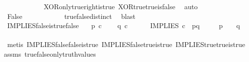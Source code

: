\begin{isabellebody}
\ \ \ \ \ \ \ \ \ \ \isamarkupfalse%
\ XOR{\isacharunderscore}{\kern0pt}only{\isacharunderscore}{\kern0pt}true{\isacharunderscore}{\kern0pt}right{\isacharunderscore}{\kern0pt}is{\isacharunderscore}{\kern0pt}true\ XOR{\isacharunderscore}{\kern0pt}true{\isacharunderscore}{\kern0pt}true{\isacharunderscore}{\kern0pt}is{\isacharunderscore}{\kern0pt}false\ \isamarkupfalse%
\ auto\isanewline
\ \ \ \ \ \ \ \ \isamarkupfalse%
\ \isamarkupfalse%
\ False\isanewline
\ \ \ \ \ \ \ \ \ \ \isamarkupfalse%
\ true{\isacharunderscore}{\kern0pt}false{\isacharunderscore}{\kern0pt}distinct\ \isamarkupfalse%
\ blast\isanewline
\ \ \ \ \ \ \isamarkupfalse%
\isanewline
\ \ \ \ \isamarkupfalse%
\isanewline
\ \ \isamarkupfalse%
\isanewline
{}\isamarkupfalse%
%
\endisatagproof
{\isafoldproof}%
%
\isadelimproof
\isanewline
%
\endisadelimproof
\isanewline
{}\isamarkupfalse%
\ IMPLIES{\isacharunderscore}{\kern0pt}false{\isacharunderscore}{\kern0pt}is{\isacharunderscore}{\kern0pt}true{\isacharunderscore}{\kern0pt}false{\isacharcolon}{\kern0pt}\isanewline
\ \ \ {\isachardoublequoteopen}p\ {\isasymin}\isactrlsub c\ {\isasymOmega}{\isachardoublequoteclose}\isanewline
\ \ \ {\isachardoublequoteopen}q\ {\isasymin}\isactrlsub c\ {\isasymOmega}{\isachardoublequoteclose}\ \ \isanewline
\ \ \ {\isachardoublequoteopen}IMPLIES\ {\isasymcirc}\isactrlsub c\ \ {\isasymlangle}p{\isacharcomma}{\kern0pt}q{\isasymrangle}\ {\isacharequal}{\kern0pt}\ {\isasymf}{\isachardoublequoteclose}\isanewline
\ \ \ {\isachardoublequoteopen}p\ {\isacharequal}{\kern0pt}\ {\isasymt}\ {\isasymand}\ q\ {\isacharequal}{\kern0pt}\ {\isasymf}{\isachardoublequoteclose}\isanewline
%
\isadelimproof
\ \ %
\endisadelimproof
%
\isatagproof
{}\isamarkupfalse%
\ {\isacharparenleft}{\kern0pt}metis\ IMPLIES{\isacharunderscore}{\kern0pt}false{\isacharunderscore}{\kern0pt}false{\isacharunderscore}{\kern0pt}is{\isacharunderscore}{\kern0pt}true\ IMPLIES{\isacharunderscore}{\kern0pt}false{\isacharunderscore}{\kern0pt}true{\isacharunderscore}{\kern0pt}is{\isacharunderscore}{\kern0pt}true\ IMPLIES{\isacharunderscore}{\kern0pt}true{\isacharunderscore}{\kern0pt}true{\isacharunderscore}{\kern0pt}is{\isacharunderscore}{\kern0pt}true\ assms\ true{\isacharunderscore}{\kern0pt}false{\isacharunderscore}{\kern0pt}only{\isacharunderscore}{\kern0pt}truth{\isacharunderscore}{\kern0pt}values{\isacharparenright}{\kern0pt}%

\end{isabellebody}
